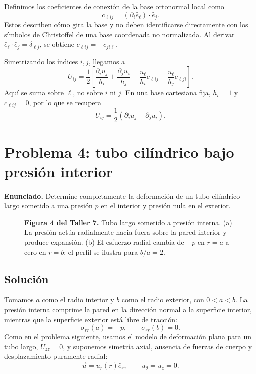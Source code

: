 \documentclass[a4paper]{article}
\begin{document}
Definimos los coeficientes de conexión de la base ortonormal local como
\[
c_{\ell i j}=(\partial_i\hat e_\ell)\cdot\hat e_j.
\]
Estos describen cómo gira la base y no deben identificarse directamente con los símbolos de Christoffel de una base coordenada no normalizada. Al derivar $\hat e_\ell\cdot\hat e_j=\delta_{\ell j}$, se obtiene $c_{\ell i j}=-c_{j i\ell}$.

Simetrizando los índices $i,j$, llegamos a
\[
\boxed{U_{ij}=\frac{1}{2}
\left[
\frac{\partial_i u_j}{h_i}
+\frac{\partial_j u_i}{h_j}
+\frac{u_\ell}{h_i}c_{\ell i j}
+\frac{u_\ell}{h_j}c_{\ell j i}
\right]}.
\]
Aquí se suma sobre $\ell$, no sobre $i$ ni $j$. En una base cartesiana fija, $h_i=1$ y $c_{\ell i j}=0$, por lo que se recupera
\[
U_{ij}=\frac{1}{2}(\partial_i u_j+\partial_j u_i).
\]




\section{Problema 4: tubo cilíndrico bajo presión interior}

\textbf{Enunciado.} Determine completamente la deformación de un tubo cilíndrico largo sometido a una presión $p$ en el interior y presión nula en el exterior.

\begin{figure}[H]
\centering

\par\medskip
\textbf{Figura 4 del Taller 7.} Tubo largo sometido a presión interna. (a) La presión actúa radialmente hacia fuera sobre la pared interior y produce expansión. (b) El esfuerzo radial cambia de $-p$ en $r=a$ a cero en $r=b$; el perfil se ilustra para $b/a=2$.
\end{figure}

\subsection{Solución}

Tomamos $a$ como el radio interior y $b$ como el radio exterior, con $0<a<b$. La presión interna comprime la pared en la dirección normal a la superficie interior, mientras que la superficie exterior está libre de tracción:
\[
\sigma_{rr}(a)=-p,
\qquad
\sigma_{rr}(b)=0.
\]
Como en el problema siguiente, usamos el modelo de deformación plana para un tubo largo, $U_{zz}=0$, y suponemos simetría axial, ausencia de fuerzas de cuerpo y desplazamiento puramente radial:
\[
\vec u=u_r(r)\hat e_r,
\qquad u_\theta=u_z=0.
\]
\end{document}
